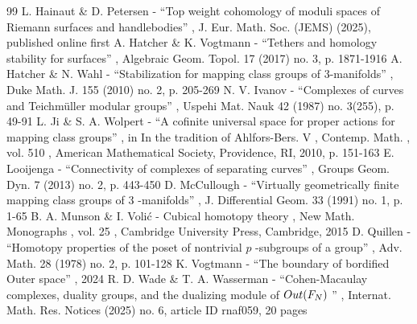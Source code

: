 \documentclass[11pt]{article}
\theoremstyle{plain}
\theoremstyle{definition}
\begin{document}
\begin{thebibliography}{99}
 L. Hainaut \& D. Petersen - “Top weight cohomology of moduli spaces of Riemann surfaces and handlebodies” , J. Eur. Math. Soc. (JEMS) (2025), published online first
 A. Hatcher \& K. Vogtmann - “Tethers and homology stability for surfaces” , Algebraic Geom. Topol. 17 (2017) no. 3, p. 1871-1916
 A. Hatcher \& N. Wahl - “Stabilization for mapping class groups of 3-manifolds” , Duke Math. J. 155 (2010) no. 2, p. 205-269
 N. V. Ivanov - “Complexes of curves and Teichmüller modular groups” , Uspehi Mat. Nauk 42 (1987) no. 3(255), p. 49-91
 L. Ji \& S. A. Wolpert - “A cofinite universal space for proper actions for mapping class groups” , in In the tradition of Ahlfors-Bers. V , Contemp. Math. , vol. 510 , American Mathematical Society, Providence, RI, 2010, p. 151-163
 E. Looijenga - “Connectivity of complexes of separating curves” , Groups Geom. Dyn. 7 (2013) no. 2, p. 443-450
 D. McCullough - “Virtually geometrically finite mapping class groups of $3$ -manifolds” , J. Differential Geom. 33 (1991) no. 1, p. 1-65
 B. A. Munson \& I. Volić - Cubical homotopy theory , New Math. Monographs , vol. 25 , Cambridge University Press, Cambridge, 2015
 D. Quillen - “Homotopy properties of the poset of nontrivial $p$ -subgroups of a group” , Adv. Math. 28 (1978) no. 2, p. 101-128
 K. Vogtmann - “The boundary of bordified Outer space” , 2024
 R. D. Wade \& T. A. Wasserman - “Cohen-Macaulay complexes, duality groups, and the dualizing module of ${\rm Out}(F_N)$ ” , Internat. Math. Res. Notices (2025) no. 6, article ID rnaf059, 20 pages
\end{thebibliography}
\end{document}
